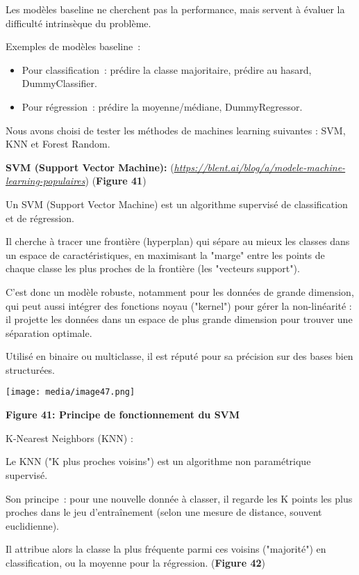 Les modèles baseline ne cherchent pas la performance, mais servent à
évaluer la difficulté intrinsèque du problème.

Exemples de modèles baseline~:

\begin{itemize}
\tightlist
\item
  Pour classification~: prédire la classe majoritaire, prédire au
  hasard, DummyClassifier.
\item
  Pour régression~: prédire la moyenne/médiane, DummyRegressor.
\end{itemize}

Nous avons choisi de tester les méthodes de machines learning suivantes
: SVM, KNN et Forest Random.

\textbf{SVM (Support Vector Machine):
}(\href{https://blent.ai/blog/a/modele-machine-learning-populaires}{\emph{https://blent.ai/blog/a/modele-machine-learning-populaires}})
(\textbf{Figure 41})

Un SVM (Support Vector Machine) est un algorithme supervisé de
classification et de régression.

Il cherche à tracer une frontière (hyperplan) qui sépare au mieux les
classes dans un espace de caractéristiques, en maximisant la "marge"
entre les points de chaque classe les plus proches de la frontière (les
"vecteurs support").

C'est donc un modèle robuste, notamment pour les données de grande
dimension, qui peut aussi intégrer des fonctions noyau ("kernel") pour
gérer la non-linéarité : il projette les données dans un espace de plus
grande dimension pour trouver une séparation optimale.

Utilisé en binaire ou multiclasse, il est réputé pour sa précision sur
des bases bien structurées.

\texttt{[image: media/image47.png]}

\textbf{ Figure 41: Principe de fonctionnement du SVM }

K-Nearest Neighbors (KNN) :

Le KNN ("K plus proches voisins") est un algorithme non paramétrique
supervisé.

Son principe~: pour une nouvelle donnée à classer, il regarde les K
points les plus proches dans le jeu d'entraînement (selon une mesure de
distance, souvent euclidienne).

Il attribue alors la classe la plus fréquente parmi ces voisins
("majorité") en classification, ou la moyenne pour la régression.
(\textbf{Figure 42})

